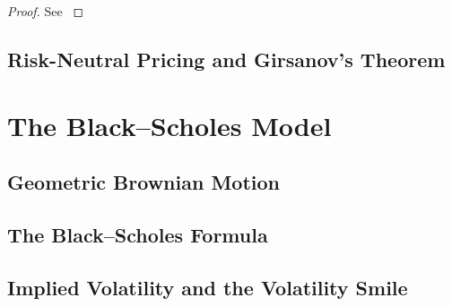 \documentclass[11pt, a4paper]{article}
\numberwithin{equation}{subsection}
\numberwithin{definition}{subsection}
\numberwithin{theorem}{subsection}
\numberwithin{remark}{subsection}
\begin{document}
\begin{proof}
    See \cite[p.~167]{shreve2004}
\end{proof}

\subsection{Risk-Neutral Pricing and Girsanov's Theorem}


\section{The Black--Scholes Model}

\subsection{Geometric Brownian Motion}

\subsection{The Black--Scholes Formula}

\subsection{Implied Volatility and the Volatility Smile}
\end{document}
